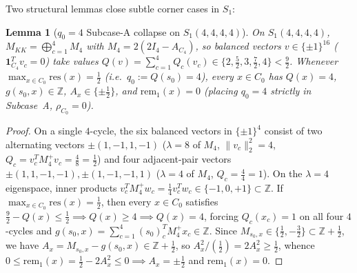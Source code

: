 \documentclass[11pt,reqno]{amsart}
\newtheorem{lemma}[theorem]{Lemma}
\theoremstyle{definition}
\theoremstyle{remark}
\numberwithin{equation}{section}
\numberwithin{table}{section}
\begin{document}
Two structural lemmas close subtle corner cases in $S_1$:

\begin{lemma}[$q_0 = 4$ Subcase-A collapse on $S_1(4,4,4,4)$]\label{lem:alg88}
On $S_1(4, 4, 4, 4)$, $M_{KK} = \bigoplus_{c=1}^4 M_4$ with $M_4 = 2(2I_4 - A_{C_4})$, so balanced vectors $v \in \{\pm 1\}^{16}$ ($\mathbf{1}_{C_4}^T v_c = 0$) take values $Q(v) = \sum_{c=1}^4 Q_c(v_c) \in \{2, \frac{5}{2}, 3, \frac{7}{2}, 4\} < \frac{9}{2}$. Whenever $\max_{x \in C_0} \mathrm{res}(x) = \frac{1}{2}$ (i.e.\ $q_0 := Q(s_0) = 4$), every $x \in C_0$ has $Q(x) = 4$, $g(s_0, x) \in \mathbb{Z}$, $A_x \in \{ \pm \frac{1}{2} \}$, and $\mathrm{rem}_1(x) = 0$ (placing $q_0 = 4$ strictly in Subcase~A, $\rho_{C_0} = 0$).
\end{lemma}

\begin{proof}
On a single $4$-cycle, the six balanced vectors in $\{\pm 1\}^4$ consist of two alternating vectors $\pm(1,-1,1,-1)$ ($\lambda = 8$ of $M_4$, $\|v_c\|_2^2 = 4$, $Q_c = v_c^T M_4^+ v_c = \frac{4}{8} = \frac{1}{2}$) and four adjacent-pair vectors $\pm(1,1,-1,-1), \pm(1,-1,-1,1)$ ($\lambda = 4$ of $M_4$, $Q_c = \frac{4}{4} = 1$). On the $\lambda = 4$ eigenspace, inner products $v_c^T M_4^+ w_c = \frac{1}{4} v_c^T w_c \in \{-1, 0, +1\} \subset \mathbb{Z}$. If $\max_{x \in C_0} \mathrm{res}(x) = \frac{1}{2}$, then every $x \in C_0$ satisfies $\frac{9}{2} - Q(x) \le \frac{1}{2} \implies Q(x) \ge 4 \implies Q(x) = 4$, forcing $Q_c(x_c) = 1$ on all four $4$-cycles and $g(s_0, x) = \sum_{c=1}^4 (s_0)_c^T M_4^+ x_c \in \mathbb{Z}$. Since $M_{s_0, x} \in \{\frac{1}{2}, -\frac{3}{2}\} \subset \mathbb{Z} + \frac{1}{2}$, we have $A_x = M_{s_0, x} - g(s_0, x) \in \mathbb{Z} + \frac{1}{2}$, so $A_x^2 / (\frac{1}{2}) = 2A_x^2 \ge \frac{1}{2}$, whence $0 \le \mathrm{rem}_1(x) = \frac{1}{2} - 2A_x^2 \le 0 \implies A_x = \pm \frac{1}{2}$ and $\mathrm{rem}_1(x) = 0$.
\end{proof}
\end{document}
